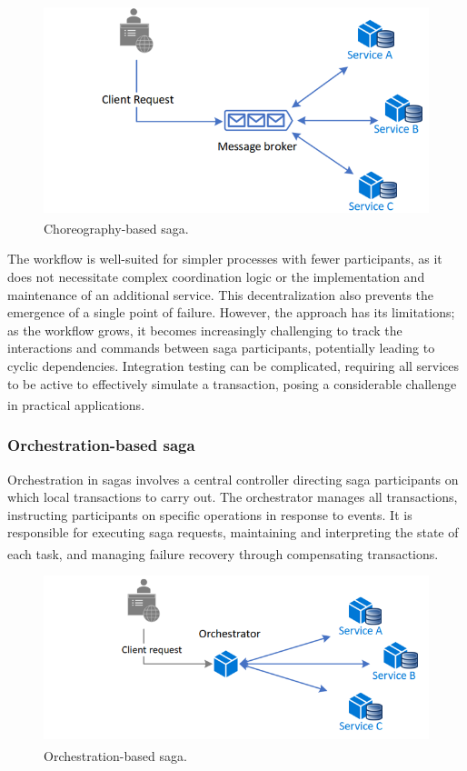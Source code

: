 \newpage

\begin{figure}
    \centering
    \includegraphics[scale=0.55]{Pictures/3_choreography.png}
    \caption{Choreography-based saga\textsuperscript{\cite{ms_sagas}}.}
    \label{fig:3_choreography}
\end{figure}

The workflow is well-suited for simpler processes with fewer participants, as it does not
necessitate complex coordination logic or the implementation and maintenance of an additional
service. This decentralization also prevents the emergence of a single point of failure. However,
the approach has its limitations; as the workflow grows, it becomes increasingly challenging to
track the interactions and commands between saga participants, potentially leading to cyclic
dependencies. Integration testing can be complicated, requiring all services to be
active to effectively simulate a transaction, posing a considerable challenge in practical
applications\textsuperscript{\cite{ms_sagas}}.

\subsubsection{Orchestration-based saga}
Orchestration in sagas involves a central controller directing saga participants on which local
transactions to carry out. The orchestrator manages all transactions, instructing participants on
specific operations in response to events. It is responsible for executing saga requests,
maintaining and interpreting the state of each task, and managing failure recovery through
compensating transactions\textsuperscript{\cite{ms_sagas}}.

\begin{figure}
    \centering
    \includegraphics[scale=0.55]{Pictures/3_orchestrator.png}
    \caption{Orchestration-based saga\textsuperscript{\cite{ms_sagas}}.}
    \label{fig:3_orchestration}
\end{figure}

